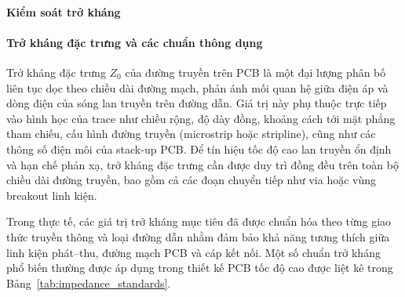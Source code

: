                 \paragraph{Kiểm soát trở kháng}
                    \paragraph{Trở kháng đặc trưng và các chuẩn thông dụng}
                        Trở kháng đặc trưng \(Z_0\) của đường truyền trên PCB là một đại lượng phân bố liên tục dọc theo chiều dài đường mạch, phản ánh mối quan hệ giữa điện áp và dòng điện của sóng lan truyền trên đường dẫn. Giá trị này phụ thuộc trực tiếp vào hình học của trace như chiều rộng, độ dày đồng, khoảng cách tới mặt phẳng tham chiếu, cấu hình đường truyền (microstrip hoặc stripline), cũng như các thông số điện môi của stack-up PCB. Để tín hiệu tốc độ cao lan truyền ổn định và hạn chế phản xạ, trở kháng đặc trưng cần được duy trì đồng đều trên toàn bộ chiều dài đường truyền, bao gồm cả các đoạn chuyển tiếp như via hoặc vùng breakout linh kiện.

                        Trong thực tế, các giá trị trở kháng mục tiêu đã được chuẩn hóa theo từng giao thức truyền thông và loại đường dẫn nhằm đảm bảo khả năng tương thích giữa linh kiện phát–thu, đường mạch PCB và cáp kết nối. Một số chuẩn trở kháng phổ biến thường được áp dụng trong thiết kế PCB tốc độ cao được liệt kê trong Bảng~\ref{tab:impedance_standards}.
                        

